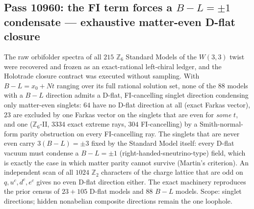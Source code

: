 \subsection{Pass 10960: the FI term forces a $B-L=\pm1$ condensate --- exhaustive matter-even D-flat closure}

The raw orbifolder spectra of all $215$ $\mathbb{Z}_6$ Standard Models of the $W(3,3)$
twist were recovered and frozen as an exact-rational left-chiral ledger, and the
Holotrade closure contract was executed without sampling.  With
$B-L=x_0+Nt$ ranging over its full rational solution set, none of the $88$ models
with a $B-L$ direction admits a D-flat, FI-cancelling singlet direction condensing only
matter-even singlets: $64$ have no D-flat direction at all (exact Farkas vector),
$23$ are excluded by one Farkas vector on the singlets that are even for \emph{some}
$t$, and one ($\mathbb{Z}_6$-II, $3334$ exact extreme rays, $304$ FI-cancelling) by a
Smith-normal-form parity obstruction on every FI-cancelling ray.  The singlets that
are never even carry $3(B-L)=\pm3$ fixed by the Standard Model itself: every D-flat
vacuum must condense a $B-L=\pm1$ (right-handed-sneutrino-type) field, which is
exactly the case in which matter parity cannot survive (Martin's criterion).  An
independent scan of all $1024$ $\mathbb{Z}_2$ characters of the charge lattice that are
odd on $q,u^c,d^c,e^c$ gives no even D-flat direction either.  The exact machinery
reproduces the prior census of $23+105$ D-flat models and $88$ $B-L$ models.  Scope:
singlet directions; hidden nonabelian composite directions remain the one loophole.

